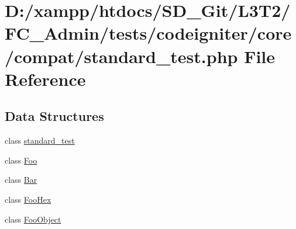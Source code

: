 \hypertarget{_admin_2tests_2codeigniter_2core_2compat_2standard__test_8php}{}\section{D\+:/xampp/htdocs/\+S\+D\+\_\+\+Git/\+L3\+T2/\+F\+C\+\_\+\+Admin/tests/codeigniter/core/compat/standard\+\_\+test.php File Reference}
\label{_admin_2tests_2codeigniter_2core_2compat_2standard__test_8php}
\subsection*{Data Structures}
\begin{DoxyCompactItemize}
\item 
class \hyperlink{classstandard__test}{standard\+\_\+test}
\item 
class \hyperlink{class_foo}{Foo}
\item 
class \hyperlink{class_bar}{Bar}
\item 
class \hyperlink{class_foo_hex}{Foo\+Hex}
\item 
class \hyperlink{class_foo_object}{Foo\+Object}
\end{DoxyCompactItemize}
